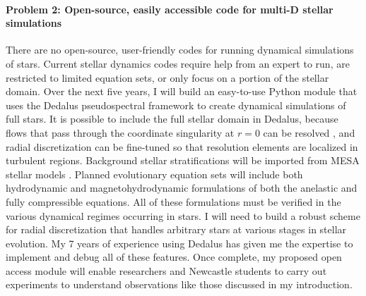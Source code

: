 \documentclass[12pt]{article}
\begin{document}
\paragraph*{Problem 2: Open-source, easily accessible code for multi-D stellar simulations}
There are no open-source, user-friendly codes for running dynamical simulations of stars.
Current stellar dynamics codes require help from an expert to run, are restricted to limited equation sets, or only focus on a portion of the stellar domain.
Over the next five years, I will build an easy-to-use Python module that uses the Dedalus pseudospectral framework \citep{burns_etal_2020} to create dynamical simulations of full stars.
It is possible to include the full stellar domain in Dedalus, because flows that pass through the coordinate singularity at $r = 0$ can be resolved \citep{vasil_etal_2019, lecoanet_etal_2019}, and radial discretization can be fine-tuned so that resolution elements are localized in turbulent regions.
Background stellar stratifications will be imported from MESA stellar models \citep{paxton&all2011}.
Planned evolutionary equation sets will include both hydrodynamic and magnetohydrodynamic formulations of both the anelastic and fully compressible equations.
All of these formulations must be verified in the various dynamical regimes occurring in stars.
I will need to build a robust scheme for radial discretization that handles arbitrary stars at various stages in stellar evolution.
My 7 years of experience using Dedalus has given me the expertise to implement and debug all of these features.
Once complete, my proposed open access module will enable researchers and Newcastle students to carry out experiments to understand observations like those discussed in my introduction.

\end{document}
